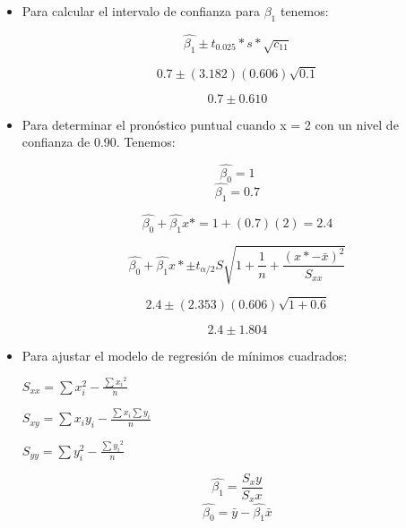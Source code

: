 \documentclass{../oxmathproblems}
\begin{document}
\begin{questions}
\begin{itemize}

\item  Para calcular el intervalo de confianza para $\beta_1$ tenemos: 


$$ \hat{\beta_1} \pm t_{0.025} *s* \sqrt {c_{11}} $$ 


$$ 0.7 \pm (3.182)(0.606)\sqrt{0.1} $$ 


$$ 0.7 \pm 0.610 $$



\item Para determinar el pronóstico puntual cuando x = 2 con un nivel de confianza de 0.90. Tenemos:

$$ \hat{\beta_0} = 1$$
$$ \hat{\beta_1} = 0.7 $$ 

 $$ \hat{\beta_0} + \hat{\beta_1}x* = 1 + (0.7)(2) = 2.4 $$ 
 
 

$$ \hat{\beta_0} +\hat{\beta_1}x* \pm t_{\alpha/2} S \sqrt{1+\frac{1}{n} + \frac{(x*-\bar{x})^2}{S_{xx}}}$$ 


$$ 2.4 \pm (2.353)(0.606)\sqrt{1+0.6} $$ 

$$ 2.4 \pm 1.804 $$ 
\end{itemize}

\miquestion 
\begin{itemize}
\item Para ajustar el modelo de regresión de mínimos cuadrados: 

$ S_{xx} = \sum{x_i^2} - \frac{\sum{x_i}^2}{n}$  

$ S_{xy} = \sum{x_iy_i} - \frac{\sum{x_i}\sum{y_i}}{n} $

$ S_{yy} = \sum{y_i^2} - \frac{\sum{y_i}^2}{n}$  

$$ \hat{\beta_1} = \frac{S_xy}{S_xx} $$ 
$$ \hat{\beta_0} = \bar{y} -\hat{\beta_1}\bar{x}  $$



\end{itemize}
\end{questions}
\end{document}
